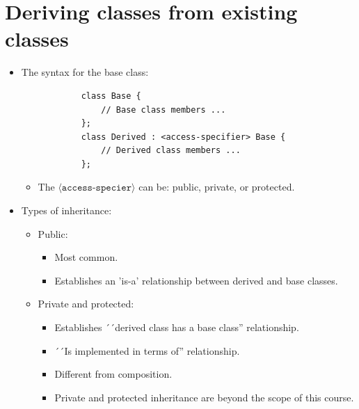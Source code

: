 \section{Deriving  classes from existing classes}
\begin{itemize}
    \item The syntax for the base class:
        \begin{verbatim}
            class Base {
                // Base class members ...
            };
            class Derived : <access-specifier> Base {
                // Derived class members ...
            };
        \end{verbatim}
        \begin{itemize}
            \item The $\displaystyle \langle \texttt{access-specier} \rangle$ can be: public, private, or protected.
        \end{itemize}
    
    \item Types of inheritance:
        \begin{itemize}
            \item Public: 
                \begin{itemize}
                    \item Most common.
                    \item Establishes an 'is-a' relationship between derived and base classes.
                \end{itemize}
            
            \item Private and protected:
                \begin{itemize}
                    \item Establishes ´´derived class has a base class'' relationship.
                    \item ´´Is implemented in terms of'' relationship.
                    \item Different from composition.
                    \item Private and protected inheritance are beyond the scope of this course.
                \end{itemize}
        \end{itemize}
    

\end{itemize}
